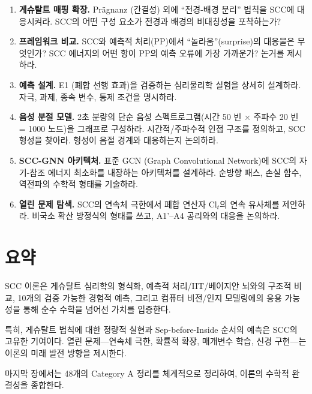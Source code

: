 \begin{enumerate}
    \item \textbf{게슈탈트 매핑 확장.} Pr\"agnanz (간결성) 외에 ``전경-배경 분리'' 법칙을 SCC에 대응시켜라. SCC의 어떤 구성 요소가 전경과 배경의 비대칭성을 포착하는가?

    \item \textbf{프레임워크 비교.} SCC와 예측적 처리(PP)에서 ``놀라움''(surprise)의 대응물은 무엇인가? SCC 에너지의 어떤 항이 PP의 예측 오류에 가장 가까운가? 논거를 제시하라.

    \item \textbf{예측 설계.} E1 (폐합 선행 효과)을 검증하는 심리물리학 실험을 상세히 설계하라. 자극, 과제, 종속 변수, 통제 조건을 명시하라.

    \item \textbf{음성 분절 모델.} 2초 분량의 단순 음성 스펙트로그램(시간 50 빈 $\times$ 주파수 20 빈 = 1000 노드)을 그래프로 구성하라. 시간적/주파수적 인접 구조를 정의하고, SCC 형성을 찾아라. 형성이 음절 경계와 대응하는지 논의하라.

    \item \textbf{SCC-GNN 아키텍처.} 표준 GCN (Graph Convolutional Network)에 SCC의 자기-참조 에너지 최소화를 내장하는 아키텍처를 설계하라. 순방향 패스, 손실 함수, 역전파의 수학적 형태를 기술하라.

    \item \textbf{열린 문제 탐색.} SCC의 연속체 극한에서 폐합 연산자 $\mathrm{Cl}_t$의 연속 유사체를 제안하라. 비국소 확산 방정식의 형태를 쓰고, A1'--A4 공리와의 대응을 논의하라.
\end{enumerate}


\section{요약}
\label{sec:ch14-summary}

SCC 이론은 게슈탈트 심리학의 형식화, 예측적 처리/IIT/베이지안 뇌와의 구조적 비교, 10개의 검증 가능한 경험적 예측, 그리고 컴퓨터 비전/인지 모델링에의 응용 가능성을 통해 순수 수학을 넘어선 가치를 입증한다.

특히, 게슈탈트 법칙에 대한 정량적 실현과 Sep-before-Inside 순서의 예측은 SCC의 고유한 기여이다. 열린 문제---연속체 극한, 확률적 확장, 매개변수 학습, 신경 구현---는 이론의 미래 발전 방향을 제시한다.

마지막 장에서는 48개의 Category A 정리를 체계적으로 정리하여, 이론의 수학적 완결성을 종합한다.
